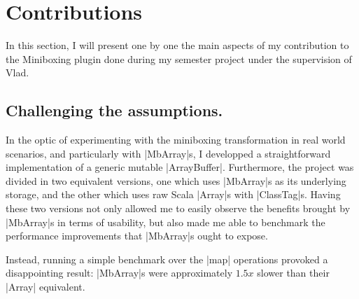 \section{Contributions}
\label{sec:contrib}

In this section, I will present one by one the main aspects of my contribution to the Miniboxing plugin done during my semester project under the supervision of Vlad.
\subsection{Challenging the assumptions.} 

In the optic of experimenting with the miniboxing transformation in real world scenarios, and particularly with |MbArray|s, I developped a straightforward implementation of a generic mutable |ArrayBuffer|. Furthermore, the project was divided in two equivalent versions, one which uses |MbArray|s as its underlying storage, and the other which uses raw Scala |Array|s with |ClassTag|s. Having these two versions not only allowed me to easily observe the benefits brought by |MbArray|s in terms of usability, but also made me able to benchmark the performance improvements that |MbArray|s ought to expose.

Instead, running a simple benchmark over the |map| operations provoked a disappointing result: |MbArray|s were approximately $1.5x$ slower than their |Array| equivalent.


